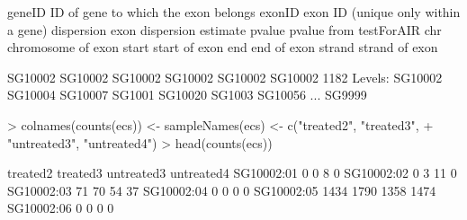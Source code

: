 \documentclass{article}
\begin{document}
\begin{Schunk}
\begin{Soutput}
geneID     ID of gene to which the exon belongs
exonID      exon ID (unique only within a gene)
dispersion             exon dispersion estimate
pvalue                   pvalue from testForAIR
chr                          chromosome of exon
start                             start of exon
end                                 end of exon
strand                           strand of exon
\end{Soutput}
\begin{Soutput}
[1] SG10002 SG10002 SG10002 SG10002 SG10002 SG10002
1182 Levels: SG10002 SG10004 SG10007 SG1001 SG10020 SG1003 SG10056 ... SG9999
\end{Soutput}
\begin{Sinput}
> colnames(counts(ecs)) <- sampleNames(ecs) <- c("treated2", "treated3", 
+     "untreated3", "untreated4")
> head(counts(ecs))
\end{Sinput}
\begin{Soutput}
           treated2 treated3 untreated3 untreated4
SG10002:01        0        0          8          0
SG10002:02        0        3         11          0
SG10002:03       71       70         54         37
SG10002:04        0        0          0          0
SG10002:05     1434     1790       1358       1474
SG10002:06        0        0          0          0
\end{Soutput}
\end{Schunk}
\normalsize
\end{document}
